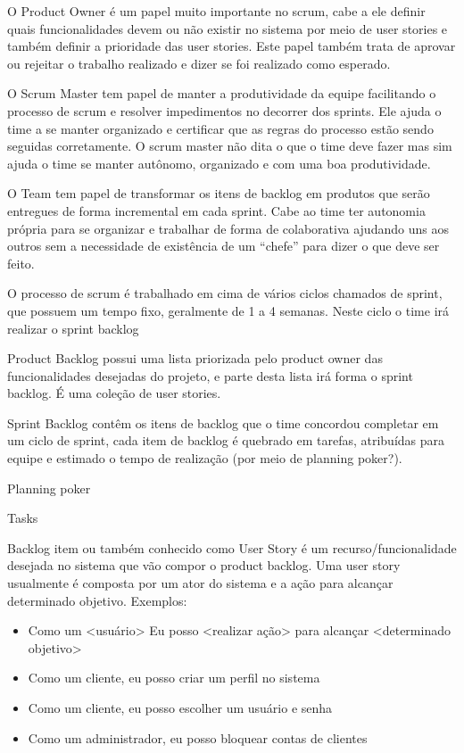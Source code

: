 \documentclass{abnt}
\begin{document}
		O Product Owner é um papel muito importante no scrum, cabe a ele definir quais funcionalidades devem ou
		não existir no sistema por meio de user stories e também definir a prioridade das user stories. Este papel também
		trata de aprovar ou rejeitar o trabalho realizado e dizer se foi realizado como esperado.
		
		O Scrum Master tem papel de manter a produtividade da equipe facilitando o processo de scrum e resolver impedimentos
		no decorrer dos sprints. Ele ajuda o time a se manter organizado e certificar que as regras do processo estão sendo
		seguidas corretamente. O scrum master não dita o que o time deve fazer mas sim ajuda o time se manter autônomo,
		organizado e com uma boa produtividade. 
		
		O Team tem papel de transformar os itens de backlog em produtos que serão entregues de forma incremental em cada
		sprint. Cabe ao time ter autonomia própria para se organizar e trabalhar de forma de colaborativa ajudando uns aos
		outros sem a necessidade de existência de um ``chefe'' para dizer o que deve ser feito.
		
		O processo de scrum é trabalhado em cima de vários ciclos chamados de sprint, que possuem um tempo fixo, geralmente de
		1 a 4 semanas. Neste ciclo o time irá realizar o sprint backlog
		
		Product Backlog possui uma lista priorizada pelo product owner das funcionalidades desejadas do projeto, e parte
		desta lista irá forma o sprint backlog. É uma coleção de user stories.
		
		Sprint Backlog contêm os itens de backlog que o time concordou completar em um ciclo de sprint, cada item de backlog é
		quebrado em tarefas, atribuídas para equipe e estimado o tempo de realização (por meio de planning poker?).
		
		Planning poker
		
		Tasks
		
		Backlog item ou também conhecido como User Story é um recurso/funcionalidade desejada no sistema que vão compor o
		product backlog. Uma user story usualmente é composta por um ator do sistema e a ação para alcançar determinado
		objetivo. Exemplos: 
			\begin{itemize}
				\item Como um <usuário> Eu posso <realizar ação> para alcançar <determinado objetivo>
				\item Como um cliente, eu posso criar um perfil no sistema
				\item Como um cliente, eu posso escolher um usuário e senha
				\item Como um administrador, eu posso bloquear contas de clientes
			\end{itemize}
				 
\end{document}

